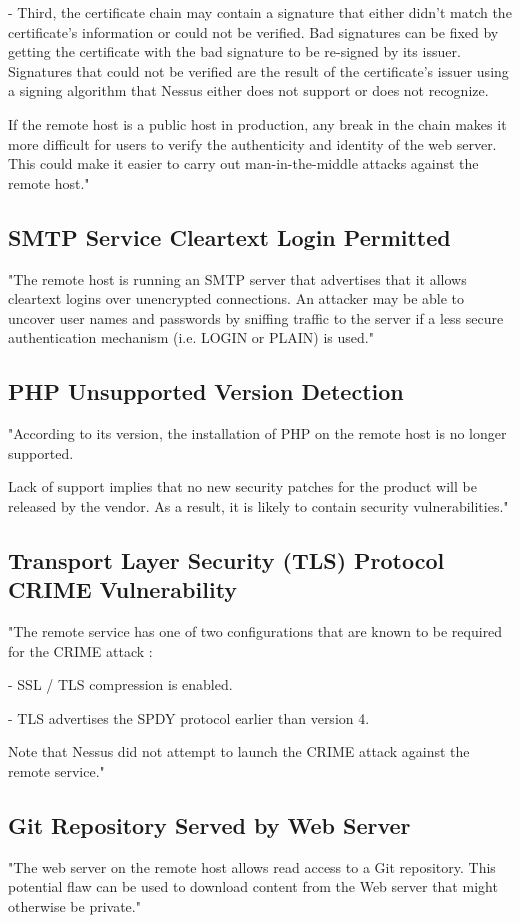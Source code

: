 \documentclass[
	12pt,				%
	openright,			%
	twoside,			%
	a4paper,			%
	english,			%
	french,				%
	spanish,			%
	brazil				%
	]{abntex2}
\begin{document}
- Third, the certificate chain may contain a signature
that either didn't match the certificate's information
or could not be verified. Bad signatures can be fixed by
getting the certificate with the bad signature to be
re-signed by its issuer. Signatures that could not be
verified are the result of the certificate's issuer
using a signing algorithm that Nessus either does not
support or does not recognize.

If the remote host is a public host in production, any break in the
chain makes it more difficult for users to verify the authenticity and 
identity of the web server. This could make it easier to carry out 
man-in-the-middle attacks against the remote host."

\subsection{SMTP Service Cleartext Login Permitted}
"The remote host is running an SMTP server that advertises that it
allows cleartext logins over unencrypted connections.  An attacker may
be able to uncover user names and passwords by sniffing traffic to the
server if a less secure authentication mechanism (i.e.  LOGIN or
PLAIN) is used."

\subsection{PHP Unsupported Version Detection}
"According to its version, the installation of PHP on the remote host
is no longer supported.

Lack of support implies that no new security patches for the product
will be released by the vendor. As a result, it is likely to contain
security vulnerabilities."

\subsection{Transport Layer Security (TLS) Protocol CRIME Vulnerability}
"The remote service has one of two configurations that are known to be
required for the CRIME attack :

- SSL / TLS compression is enabled.

- TLS advertises the SPDY protocol earlier than version 4.

Note that Nessus did not attempt to launch the CRIME attack against the
remote service."

\subsection{Git Repository Served by Web Server}
"The web server on the remote host allows read access to a Git
repository.  This potential flaw can be used to download content from
the Web server that might otherwise be private."
\end{document}
